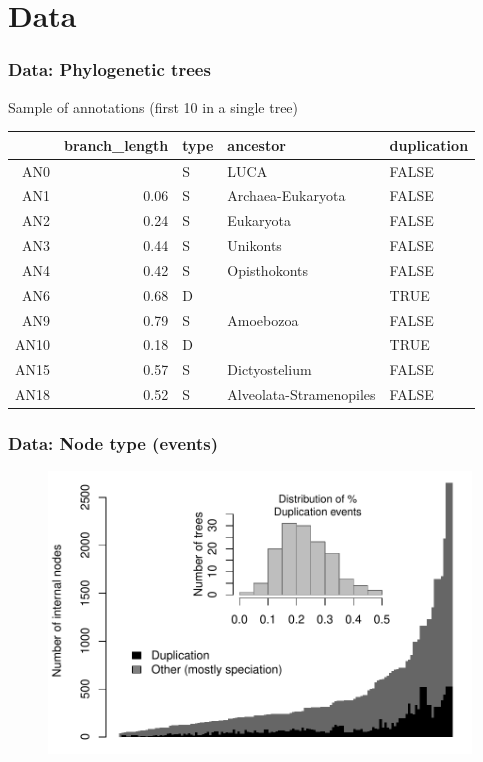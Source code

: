 \documentclass[aspectratio=169, 9pt]{beamer}\usepackage[]{graphicx}\usepackage[]{color}
\begin{document}
\section{Data}


\begin{frame}
\frametitle{Data: Phylogenetic trees}



Sample of annotations (first 10 in a single tree)

\small

\begin{table}[ht]
\centering
\begin{tabular}{rrlll}
  \toprule
 & branch\_length & type & ancestor & duplication \\ 
  \midrule
AN0 &  & S & LUCA & FALSE \\ 
  AN1 & 0.06 & S & Archaea-Eukaryota & FALSE \\ 
  AN2 & 0.24 & S & Eukaryota & FALSE \\ 
  AN3 & 0.44 & S & Unikonts & FALSE \\ 
  AN4 & 0.42 & S & Opisthokonts & FALSE \\ 
  AN6 & 0.68 & D &  & TRUE \\ 
  AN9 & 0.79 & S & Amoebozoa & FALSE \\ 
  AN10 & 0.18 & D &  & TRUE \\ 
  AN15 & 0.57 & S & Dictyostelium & FALSE \\ 
  AN18 & 0.52 & S & Alveolata-Stramenopiles & FALSE \\ 
   \bottomrule
\end{tabular}
\end{table}

\end{frame}

\begin{frame}
\frametitle{Data: Node type (events)}
\begin{figure}
\centering
\includegraphics[width=.7\linewidth]{distribution-event-type.pdf}
\end{figure}
\end{frame}
\end{document}
